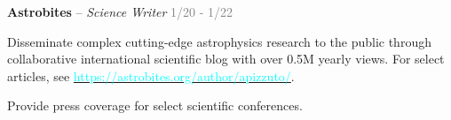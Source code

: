 

\begin{cventries}
\vspace{-0.15cm}
  \cventry
    {} %
    {\textbf{Astrobites} -- \textit{Science Writer}} %
    {\textcolor{gray}{1/20 - 1/22}} %
    {} %
    {
      \begin{cvitems} %
        \vspace{-0.4cm}
        \item {Disseminate complex cutting-edge astrophysics research to the public through collaborative international scientific blog with over 0.5M yearly views. For select articles, see \href{https://astrobites.org/author/apizzuto/}{\textcolor{cyan}{https://astrobites.org/author/apizzuto/}}.}
        \item {Provide press coverage for select scientific conferences.}
      \end{cvitems}
    }
\end{cventries}


